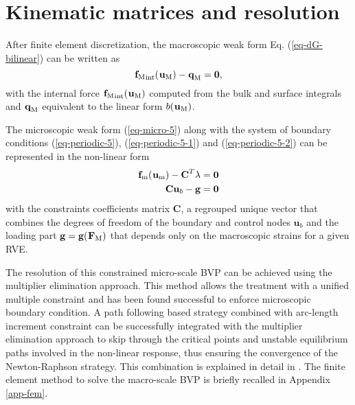 \section{Kinematic matrices and resolution}\label{ch-matrices}
After finite element discretization, the macroscopic weak form Eq. (\ref{eq-dG-bilinear}) can be written as 
\begin{equation}\label{eq-res-1}
{\tgm[]{f}}_{\text{int}}(\tgm[]{u})-\tgm[]{q}=\bm{0},
\end{equation}
with the internal force $  {\tgm[]{f}}_{\text{int}}(\tgm[]{u}) $ computed from the bulk and surface integrals and $ \tgm[]{q} $ equivalent to the linear form $ b(\tgm[]{u}) $.

The microscopic weak form  (\ref{eq-micro-5}) along with the system of boundary conditions (\ref{eq-periodic-5}), (\ref{eq-periodic-5-1}) and (\ref{eq-periodic-5-2}) can be represented in the non-linear form
\begin{eqnarray}\label{eq-res-2}
\tgmm[]{f}(\tgmm[]{u})-\textbf{C}^T\lambda=\bm{0}\nonumber\\
\textbf{C}\textbf{u}_b-\textbf{g}=\bm{0}
\end{eqnarray}
with the constraints coefficients matrix $ \textbf{C} $, a regrouped unique vector that combines the degrees of freedom of the boundary and control nodes $ \textbf{u}_b $ and the loading part $ \textbf{g}=\textbf{g}(\tgm[]{F}) $ that depends only on the macroscopic strains for a given RVE.

The resolution of this constrained micro-scale BVP can be achieved using the multiplier elimination approach\cite{ainsworthEssentialBoundaryConditions2001}. This method allows the treatment with a unified multiple constraint and has been found successful to enforce microscopic boundary condition. A path following based strategy combined with arc-length increment constraint can be successfully integrated with the multiplier elimination approach to skip through the critical points and unstable equilibrium paths involved in the non-linear response, thus ensuring the convergence of the Newton-Raphson strategy. This combination is explained in detail in \cite{nguyenComputationalHomogenizationCellular2014,nguyenUnifiedTreatmentMicroscopic2017}. The finite element method to solve the macro-scale BVP is briefly recalled in Appendix \ref{app-fem}.

